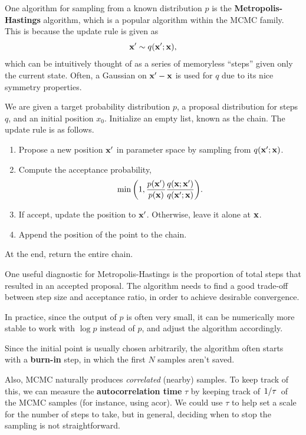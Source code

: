 \documentclass[12pt,letterpaper]{article}
\begin{document}
One algorithm for sampling from a known distribution $p$ is the \textbf{Metropolis-Hastings} algorithm, which is a popular algorithm within the MCMC family. This is because the update rule is given as
\[\vb{x'}\sim q(\vb{x'};\vb x),\]
which can be intuitively thought of as a series of memoryless ``steps'' given only the current state. Often, a Gaussian on $\vb{x'}-\vb{x}$ is used for $q$ due to its nice symmetry properties.
\begin{algorithm}
    We are given a target probability distribution $p$, a proposal distribution for steps $q$, and an initial position $x_0$. Initialize an empty list, known as the chain. The update rule is as follows.
    \begin{enumerate}
        \item Propose a new position $\vb{x'}$ in parameter space by sampling from $q(\vb{x'};\vb{x})$.
        \item Compute the acceptance probability,
        \[\min\qty(1,\frac{p(\vb{x'})}{p(\vb{x})}\frac{q(\vb{x};\vb{x'})}{q(\vb{x'};\vb{x})}).\]
        \item If accept, update the position to $\vb{x'}$. Otherwise, leave it alone at $\vb{x}$.
        \item Append the position of the point to the chain.
    \end{enumerate}
    At the end, return the entire chain.
\end{algorithm}
One useful diagnostic for Metropolis-Hastings is the proportion of total steps that resulted in an accepted proposal. The algorithm needs to find a good trade-off between step size and acceptance ratio, in order to achieve desirable convergence.

In practice, since the output of $p$ is often very small, it can be numerically more stable to work with $\log{p}$ instead of $p$, and adjust the algorithm accordingly.

Since the initial point is usually chosen arbitrarily, the algorithm often starts with a \textbf{burn-in} step, in which the first $N$ samples aren't saved.

Also, MCMC naturally produces \textit{correlated} (nearby) samples. To keep track of this, we can measure the \textbf{autocorrelation time} $\tau$ by keeping track of $\flatfrac1\tau$ of the MCMC samples (for instance, using acor). We could use $\tau$ to help set a scale for the number of steps to take, but in general, deciding when to stop the sampling is not straightforward.
\end{document}

